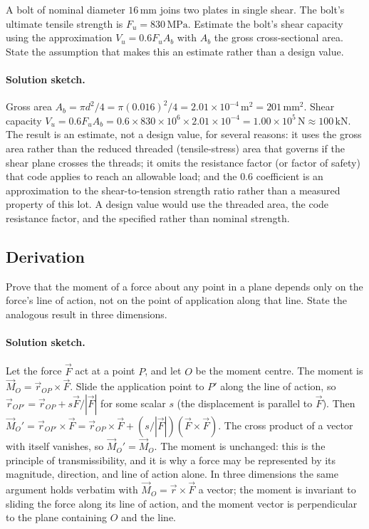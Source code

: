 \begin{exercise}
A bolt of nominal diameter $16\,\si{\milli\meter}$ joins two plates
in single shear. The bolt's ultimate tensile strength is $F_u =
830\,\text{MPa}$. Estimate the bolt's shear capacity using the
approximation $V_u = 0.6 F_u A_b$ with $A_b$ the gross
cross-sectional area. State the assumption that makes this an
estimate rather than a design value.

\paragraph{Solution sketch.} Gross area $A_b = \pi d^2 / 4 =
\pi (0.016)^2 / 4 = 2.01 \times 10^{-4}\,\si{\meter\squared} =
201\,\si{\milli\meter\squared}$. Shear capacity
$V_u = 0.6 F_u A_b = 0.6 \times 830 \times 10^{6} \times
2.01 \times 10^{-4} = 1.00 \times 10^{5}\,\text{N} \approx
100\,\text{kN}$. The result is an estimate, not a design value, for
several reasons: it uses the gross area rather than the reduced threaded
(tensile-stress) area that governs if the shear plane crosses the
threads; it omits the resistance factor (or factor of safety) that code
applies to reach an allowable load; and the $0.6$ coefficient is an
approximation to the shear-to-tension strength ratio rather than a
measured property of this lot. A design value would use the threaded
area, the code resistance factor, and the specified rather than nominal
strength.
\end{exercise}

\subsection*{Derivation}

\begin{exercise}
Prove that the moment of a force about any point in a plane depends
only on the force's line of action, not on the point of application
along that line. State the analogous result in three dimensions.

\paragraph{Solution sketch.} Let the force $\vec{F}$ act at a point
$P$, and let $O$ be the moment centre. The moment is $\vec{M}_O =
\vec{r}_{OP} \times \vec{F}$. Slide the application point to $P'$ along
the line of action, so $\vec{r}_{OP'} = \vec{r}_{OP} + s\vec{F}/|\vec{F}|$
for some scalar $s$ (the displacement is parallel to $\vec{F}$). Then
$\vec{M}_O' = \vec{r}_{OP'} \times \vec{F} = \vec{r}_{OP} \times \vec{F}
+ (s/|\vec{F}|)(\vec{F} \times \vec{F})$. The cross product of a vector
with itself vanishes, so $\vec{M}_O' = \vec{M}_O$. The moment is
unchanged: this is the principle of transmissibility, and it is why a
force may be represented by its magnitude, direction, and line of
action alone. In three dimensions the same argument holds verbatim with
$\vec{M}_O = \vec{r} \times \vec{F}$ a vector; the moment is invariant
to sliding the force along its line of action, and the moment vector is
perpendicular to the plane containing $O$ and the line.
\end{exercise}

